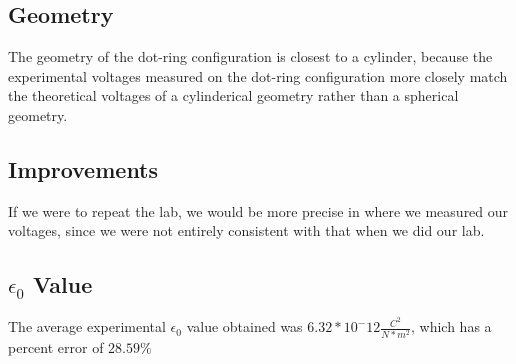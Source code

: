 \documentclass{article}
\begin{document}
\subsection{Geometry}
The geometry of the dot-ring configuration is closest to a cylinder, because the experimental voltages measured on the dot-ring configuration more closely match the theoretical voltages of a cylinderical geometry rather than a spherical geometry.
\subsection{Improvements}
If we were to repeat the lab, we would be more precise in where we measured our voltages, since we were not entirely consistent with that when we did our lab.
\subsection{$\epsilon_0$ Value}
The average experimental $\epsilon_0$ value obtained was $6.32 * 10^-12 \frac{C^2}{N * m^2}$, which has a percent error of $28.59\%$
\end{document}
